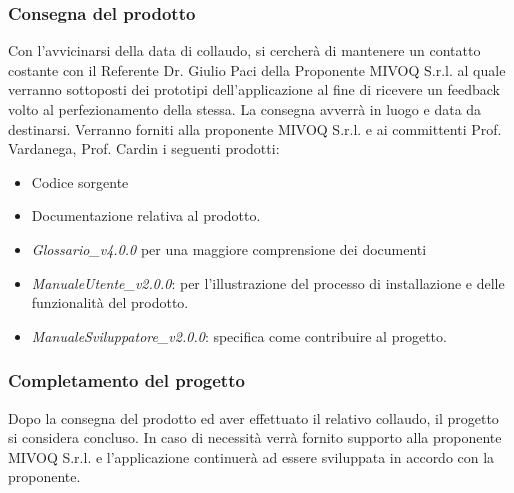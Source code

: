 \documentclass[11pt,a4paper]{article}
\begin{document}
{\subsubsection{Consegna del prodotto}
Con l’avvicinarsi della data di collaudo, si cercherà di mantenere un contatto costante con il Referente Dr. Giulio Paci della Proponente MIVOQ S.r.l. al quale verranno sottoposti dei prototipi dell’applicazione al fine di ricevere un feedback volto al perfezionamento della stessa.
La consegna avverrà in luogo e data da destinarsi.
Verranno forniti alla proponente MIVOQ S.r.l. e ai committenti Prof. Vardanega, Prof. Cardin i seguenti prodotti:
\begin{itemize}
	\item Codice sorgente
	\item Documentazione relativa al prodotto.
	\item \textit{Glossario\_v4.0.0} per una maggiore comprensione dei documenti
	\item \textit{ManualeUtente\_v2.0.0}: per l'illustrazione del processo di installazione e delle funzionalità del prodotto.
		\item \textit{ManualeSviluppatore\_v2.0.0}: specifica come contribuire al progetto.
\end{itemize}

\subsubsection{Completamento del progetto}
Dopo la consegna del prodotto ed aver effettuato il relativo collaudo, il progetto si considera concluso.
In caso di necessità verrà fornito supporto alla proponente MIVOQ S.r.l. e l'applicazione continuerà ad essere sviluppata in accordo con la proponente.

	
}
\end{document}
